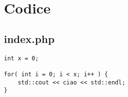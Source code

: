 \chapter*{Codice}
\section*{index.php}
\begin{footnotesize}
\begin{verbatim}
int x = 0;

for( int i = 0; i < x; i++ ) {
	std::cout << ciao << std::endl;
}

\end{verbatim}
\end{footnotesize}